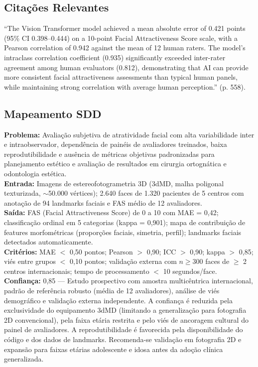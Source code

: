 \subsection{Citações Relevantes}
\begin{citacao}
``The Vision Transformer model achieved a mean absolute error of 0.421
points (95\% CI 0.398--0.444) on a 10-point Facial Attractiveness Score
scale, with a Pearson correlation of 0.942 against the mean of 12 human
raters. The model's intraclass correlation coefficient (0.935)
significantly exceeded inter-rater agreement among human evaluators
(0.812), demonstrating that AI can provide more consistent facial
attractiveness assessments than typical human panels, while maintaining
strong correlation with average human perception.'' (p. 558).
\end{citacao}

\subsection{Mapeamento SDD}
\textbf{Problema:} Avaliação subjetiva de atratividade facial com alta
variabilidade inter e intraobservador, dependência de painéis de
avaliadores treinados, baixa reprodutibilidade e ausência de métricas
objetivas padronizadas para planejamento estético e avaliação de
resultados em cirurgia ortognática e odontologia estética. \\
\textbf{Entrada:} Imagens de estereofotogrametria 3D (3dMD, malha
poligonal texturizada, $\sim$50.000 vértices); 2.640 faces de 1.320
pacientes de 5 centros com anotação de 94 landmarks faciais e FAS
médio de 12 avaliadores. \\
\textbf{Saída:} FAS (Facial Attractiveness Score) de 0 a 10 com MAE
= 0,42; classificação ordinal em 5 categorias (kappa = 0,901);
mapa de contribuição de features morfométricas (proporções faciais,
simetria, perfil); landmarks faciais detectados automaticamente. \\
\textbf{Critérios:} MAE $<$ 0,50 pontos; Pearson $>$ 0,90; ICC
$>$ 0,90; kappa $>$ 0,85; viés entre grupos $<$ 0,10 pontos;
validação externa com $n \geq 300$ faces de $\geq$ 2 centros
internacionais; tempo de processamento $<$ 10 segundos/face. \\
\textbf{Confiança:} 0,85 --- Estudo prospectivo com amostra
multicêntrica internacional, padrão de referência robusto (média
de 12 avaliadores), análise de viés demográfico e validação externa
independente. A confiança é reduzida pela exclusividade do
equipamento 3dMD (limitando a generalização para fotografia 2D
convencional), pela faixa etária restrita e pelo viés de ancoragem
cultural do painel de avaliadores. A reprodutibilidade é favorecida
pela disponibilidade do código e dos dados de landmarks. Recomenda-se
validação em fotografia 2D e expansão para faixas etárias
adolescente e idosa antes da adoção clínica generalizada.

